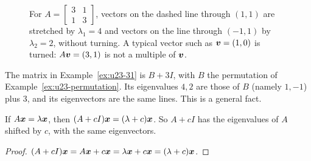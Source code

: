 \begin{figure}[ht]\centering
{}
\caption{For $A=\left[\begin{smallmatrix} 3&1\\ 1&3\end{smallmatrix}\right]$, vectors on the
dashed line through $(1,1)$ are stretched by $\lambda_1=4$ and vectors on the line through
$(-1,1)$ by $\lambda_2=2$, without turning. A typical vector such as $\boldsymbol{v}=(1,0)$ is turned:
$A\boldsymbol{v}=(3,1)$ is not a multiple of $\boldsymbol{v}$.}
\label{fig:u23-stretch}
\end{figure}

The matrix in Example~\ref{ex:u23-31} is $B+3I$, with $B$ the permutation of
Example~\ref{ex:u23-permutation}. Its eigenvalues $4,2$ are those of $B$ (namely $1,-1$)
plus $3$, and its eigenvectors are the same lines. This is a general fact.

\begin{proposition}\label{prop:u23-shift}
If $A\boldsymbol{x}=\lambda\boldsymbol{x}$, then $(A+cI)\boldsymbol{x}=(\lambda+c)\boldsymbol{x}$. So $A+cI$ has the
eigenvalues of $A$ shifted by $c$, with the same eigenvectors.
\end{proposition}

\begin{proof}
$(A+cI)\boldsymbol{x}=A\boldsymbol{x}+c\boldsymbol{x}=\lambda\boldsymbol{x}+c\boldsymbol{x}=(\lambda+c)\boldsymbol{x}$.
\end{proof}

